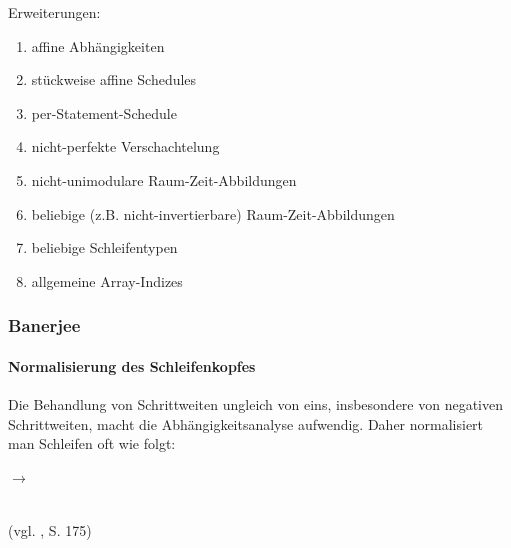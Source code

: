 Erweiterungen:
\begin{enumerate}
\item affine Abhängigkeiten\\[-7mm]
\item stückweise affine Schedules\\[-7mm]
\item per-Statement-Schedule\\[-7mm]
\item nicht-perfekte Verschachtelung\\[-7mm]
\item nicht-unimodulare Raum-Zeit-Abbildungen\\[-7mm]
\item beliebige (z.B. nicht-invertierbare) Raum-Zeit-Abbildungen\\[-7mm]
\item beliebige Schleifentypen\\[-7mm]
\item allgemeine Array-Indizes\\[-7mm]
\end{enumerate}


\subsubsection{Banerjee}

\paragraph{Normalisierung des Schleifenkopfes}

Die Behandlung von Schrittweiten ungleich von eins, insbesondere von
negativen Schrittweiten, macht die Abhängigkeitsanalyse aufwendig. Daher
normalisiert man Schleifen oft wie folgt:




\begin{minipage}{.4\textwidth}
  \begin{algorithm}[H]
  \end{algorithm}
\end{minipage}
\begin{minipage}{.5\textwidth}
    \qquad $\to$ \qquad
    \begin{algorithm}[H]
      \end{algorithm}
\end{minipage}
  ~\\
(vgl. \cite{Zima90}, S. 175)

